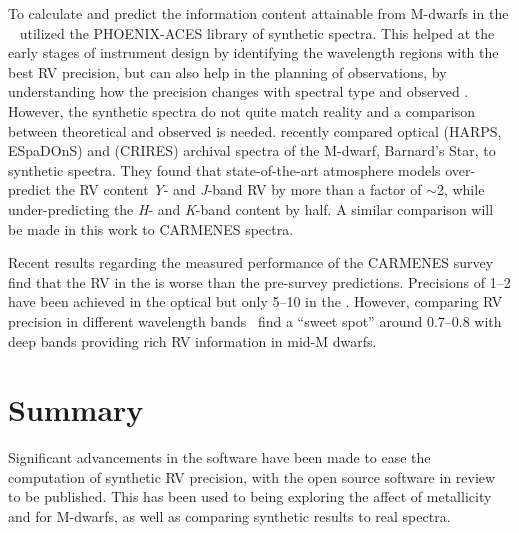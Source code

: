 To calculate and predict the information content attainable from {M-dwarfs} in the \nir{}~\citet{figueira_radial_2016} utilized the {PHOENIX-ACES} library of synthetic spectra.
This helped at the early stages of instrument design by identifying the wavelength regions with the best {RV} precision, but can also help in the planning of observations, by understanding how the precision changes with spectral type and observed {\snr{}}.
However, the synthetic spectra do not quite match reality and a comparison between theoretical and observed is needed.
\citet{artigau_optical_2018} recently compared optical ({HARPS}, {ESpaDOnS}) and \nir{} ({CRIRES}) archival spectra of the {M-dwarf}, Barnard's Star, to synthetic spectra.
They found that state-of-the-art atmosphere models over-predict the {RV} content \emph{Y}- and \emph{J}-band {RV} by more than a factor of \(\sim\)2, while under-predicting the \emph{H}- and \emph{K}-band content by half.
A similar comparison will be made in this work to {CARMENES} spectra.

Recent results regarding the measured performance of the {CARMENES} survey~\citep{reiners_carmenes_2018,quirrenbach_carmenes_2018} find that the {RV} in the \nir{} is worse than the pre-survey predictions.
Precisions of 1--2\mps{} have been achieved in the optical but only 5--10\mps{} in the \nir{}.
However, comparing RV precision in different wavelength bands~\citet{quirrenbach_carmenes_2018} find a ``sweet spot'' around 0.7--0.8\um{} with deep  bands providing rich {RV} information in mid-M dwarfs.

















\section{Summary}
Significant advancements in the \eniric{} software have been made to ease the computation of synthetic RV precision, with the open source software in review to be published.
This has been used to being exploring the affect of metallicity and \Logg{} for M-dwarfs, as well as comparing synthetic results to real spectra.
